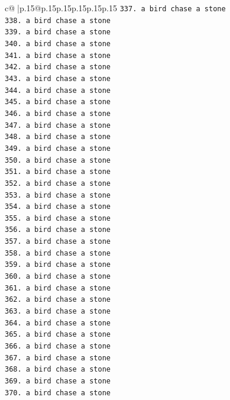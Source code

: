 \documentclass{article}
\begin{document}
{\begin{supertabular}{c@{$\;$}|p{.15\linewidth}@{}p{.15\linewidth}p{.15\linewidth}p{.15\linewidth}p{.15\linewidth}p{.15\linewidth}}
{{{\texttt{337. a bird chase a stone} \\
\texttt{338. a bird chase a stone} \\
\texttt{339. a bird chase a stone} \\
\texttt{340. a bird chase a stone} \\
\texttt{341. a bird chase a stone} \\
\texttt{342. a bird chase a stone} \\
\texttt{343. a bird chase a stone} \\
\texttt{344. a bird chase a stone} \\
\texttt{345. a bird chase a stone} \\
\texttt{346. a bird chase a stone} \\
\texttt{347. a bird chase a stone} \\
\texttt{348. a bird chase a stone} \\
\texttt{349. a bird chase a stone} \\
\texttt{350. a bird chase a stone} \\
\texttt{351. a bird chase a stone} \\
\texttt{352. a bird chase a stone} \\
\texttt{353. a bird chase a stone} \\
\texttt{354. a bird chase a stone} \\
\texttt{355. a bird chase a stone} \\
\texttt{356. a bird chase a stone} \\
\texttt{357. a bird chase a stone} \\
\texttt{358. a bird chase a stone} \\
\texttt{359. a bird chase a stone} \\
\texttt{360. a bird chase a stone} \\
\texttt{361. a bird chase a stone} \\
\texttt{362. a bird chase a stone} \\
\texttt{363. a bird chase a stone} \\
\texttt{364. a bird chase a stone} \\
\texttt{365. a bird chase a stone} \\
\texttt{366. a bird chase a stone} \\
\texttt{367. a bird chase a stone} \\
\texttt{368. a bird chase a stone} \\
\texttt{369. a bird chase a stone} \\
\texttt{370. a bird chase a stone} \\
}}}
\end{supertabular}}
\end{document}
